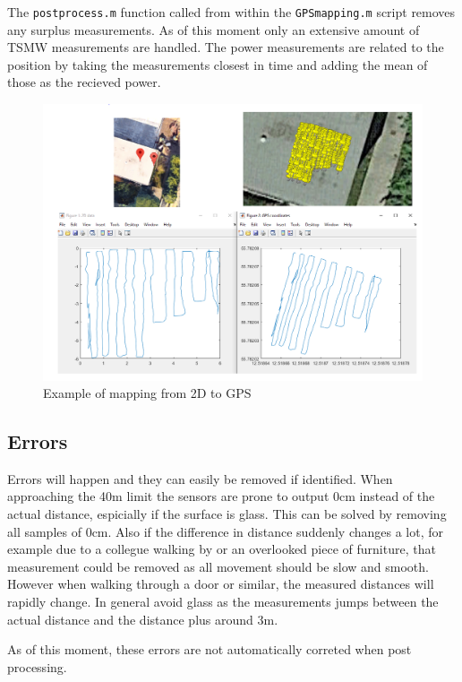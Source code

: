 \documentclass[a4paper,twoside, 12pt]{article}
\begin{document}
The \texttt{postprocess.m} function called from within the \texttt{GPSmapping.m} script removes any surplus measurements. As of this moment only an extensive amount of TSMW measurements are handled. The power measurements are related to the position by taking the measurements closest in time and adding the mean of those as the recieved power.

\begin{figure}[ht]
\centering
\includegraphics[width=\textwidth]{plotexample.png}
\caption{Example of mapping from 2D to GPS}
\label{fig:map}
\end{figure}


\subsection{Errors}
Errors will happen and they can easily be removed if identified. When approaching the 40m limit the sensors are prone to output 0cm instead of the actual distance, espicially if the surface is glass. This can be solved by removing all samples of 0cm. Also if the difference in distance suddenly changes a lot, for example due to a collegue walking by or an overlooked piece of furniture, that measurement could be removed as all movement should be slow and smooth. However when walking through a door or similar, the measured distances will rapidly change. In general avoid glass as the measurements jumps between the actual distance and the distance plus around 3m.

As of this moment, these errors are not automatically correted when post processing.
\end{document}
